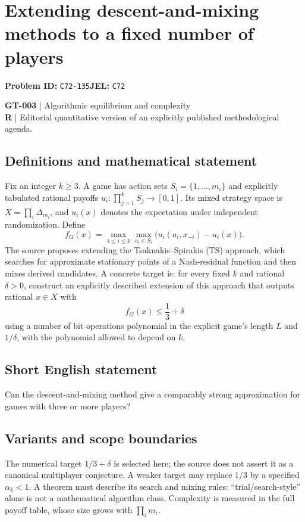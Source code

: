 \documentclass[11pt,a4paper]{article}
\begin{document}
\section*{Extending descent-and-mixing methods to a fixed number of players}
\textbf{Problem ID:} \texttt{C72-135}\quad \textbf{JEL:} \texttt{C72}\par
\label{problem:OP-0133}
\label{game:GT-003}
{\sffamily\small\color{muted}
\textbf{GT-003} | Algorithmic equilibrium and complexity\\
\textbf{R} | Editorial quantitative version of an explicitly published methodological agenda.
\par}
\subsection*{Definitions and mathematical statement}
Fix an integer $k\geq3$. A game has action sets $S_i=\{1,\ldots,m_i\}$ and explicitly tabulated rational payoffs $u_i:\prod_{j=1}^kS_j\to[0,1]$. Its mixed strategy space is $X=\prod_i\Delta_{m_i}$, and $u_i(x)$ denotes the expectation under independent randomization. Define
\[
 f_G(x)=\max_{1\leq i\leq k}\max_{a_i\in S_i}
 \bigl(u_i(a_i,x_{-i})-u_i(x)\bigr).
\]
The source proposes extending the Tsaknakis--Spirakis (TS) approach, which searches for approximate stationary points of a Nash-residual function and then mixes derived candidates. A concrete target is: for every fixed $k$ and rational $\delta>0$, construct an explicitly described extension of this approach that outputs rational $x\in X$ with
\[
 f_G(x)\leq \frac13+\delta
\]
using a number of bit operations polynomial in the explicit game's length $L$ and $1/\delta$, with the polynomial allowed to depend on $k$.
\subsection*{Short English statement}
Can the descent-and-mixing method give a comparably strong approximation for games with three or more players?
\subsection*{Variants and scope boundaries}
The numerical target $1/3+\delta$ is selected here; the source does not assert it as a canonical multiplayer conjecture. A weaker target may replace $1/3$ by a specified $\alpha_k<1$. A theorem must describe its search and mixing rules: ``trial/search-style'' alone is not a mathematical algorithm class. Complexity is measured in the full payoff table, whose size grows with $\prod_i m_i$.
\end{document}
